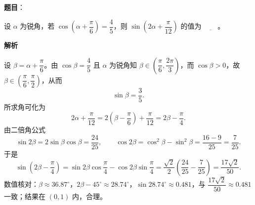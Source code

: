 \begin{answer}

\textbf{题目}：

设 $\alpha$ 为锐角，若 $\cos\left(\alpha+\dfrac\pi6\right)=\dfrac45$，则 $\sin\left(2\alpha+\dfrac\pi{12}\right)$ 的值为 $\underline{\qquad}$。

\textbf{解析}

设 $\beta=\alpha+\dfrac\pi6$。由 $\cos\beta=\dfrac45$ 且 $\alpha$ 为锐角知 $\beta\in\left(\dfrac\pi6,\dfrac{2\pi}3\right)$，而 $\cos\beta>0$，故 $\beta\in\left(\dfrac\pi6,\dfrac\pi2\right)$，从而
\nopagebreak[4]
\[\sin\beta=\frac35.\]
所求角可化为
\nopagebreak[4]
\[2\alpha+\frac\pi{12}=2\left(\beta-\frac\pi6\right)+\frac\pi{12}=2\beta-\frac\pi4.\]
由二倍角公式
\nopagebreak[4]
\[\sin2\beta=2\sin\beta\cos\beta=\frac{24}{25},\qquad\cos2\beta=\cos^2\beta-\sin^2\beta=\frac{16-9}{25}=\frac7{25}.\]
于是
\nopagebreak[4]
\[\sin\left(2\beta-\frac\pi4\right)=\sin2\beta\cos\frac\pi4-\cos2\beta\sin\frac\pi4=\frac{\sqrt2}{2}\left(\frac{24}{25}-\frac7{25}\right)=\frac{17\sqrt2}{50}.\]
数值核对：$\beta\approx36.87^\circ$，$2\beta-45^\circ\approx28.74^\circ$，$\sin28.74^\circ\approx0.481$，与 $\dfrac{17\sqrt2}{50}\approx0.481$ 一致；结果在 $(0,1)$ 内，合理。


\end{answer}
